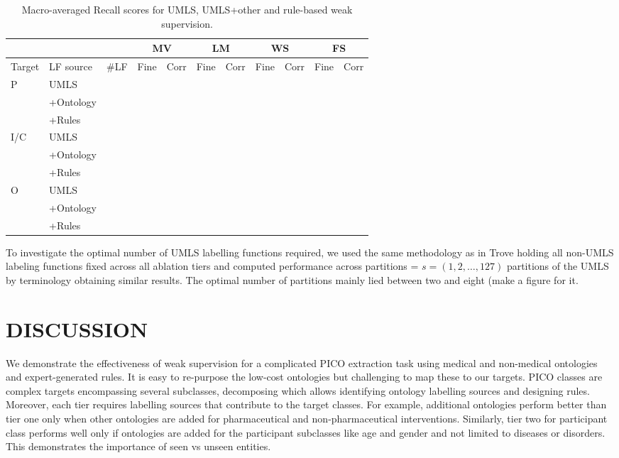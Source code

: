 \documentclass[10.7pt,]{article}
\begin{document}
\begin{table}[!ht]
    \centering
    \begin{tabular}{|l|l|l|l|l|l|l|l|l|l|l|}
        \hline
        \multicolumn{3}{|c|}{} &
        \multicolumn{2}{|c|}{MV} & \multicolumn{2}{|c|}{LM} & \multicolumn{2}{|c|}{WS} & \multicolumn{2}{|c|}{FS} \\
        \hline
        Target & LF source & \#LF & Fine & Corr & Fine & Corr & Fine & Corr & Fine & Corr \\ \hline
        P & UMLS & ~ & ~ & ~ & ~ & ~ & ~ & ~ & ~ & ~  \\ \hline
        ~ & +Ontology & ~ & ~ & ~ & ~ & ~ & ~ & ~ & ~ & ~  \\ \hline
        ~ & +Rules & ~ & ~ & ~ & ~ & ~ & ~ & ~ & ~ & ~  \\ \hline
        I/C & UMLS & ~ & ~ & ~ & ~ & ~ & ~ & ~ & ~ & ~  \\ \hline
        ~ & +Ontology & ~ & ~ & ~ & ~ & ~ & ~ & ~ & ~ & ~   \\ \hline
        ~ & +Rules & ~ & ~ & ~ & ~ & ~ & ~ & ~ & ~ & ~   \\ \hline
        O & UMLS & ~ & ~ & ~ & ~ & ~ & ~ & ~ & ~ & ~   \\ \hline
        ~ & +Ontology & ~ & ~ & ~ & ~ & ~ & ~ & ~ & ~ & ~   \\ \hline
        ~ & +Rules & ~ & ~ & ~ & ~ & ~ & ~ & ~ & ~ & ~   \\\hline
    \end{tabular}
    \caption{\label{tab:recall_res} Macro-averaged Recall scores for UMLS, UMLS+other and rule-based weak supervision.}
\end{table}

To investigate the optimal number of UMLS labelling functions required, we used the same methodology as in Trove holding all non-UMLS labeling functions fixed across all ablation tiers and computed performance across partitions = $s = ( 1, 2, \dotso , 127 )$ partitions of the UMLS by terminology obtaining similar results.
The optimal number of partitions mainly lied between two and eight (make a figure for it.
%
%
%
\section{DISCUSSION}\label{discussion}
%
We demonstrate the effectiveness of weak supervision for a complicated PICO extraction task using medical and non-medical ontologies and expert-generated rules.
It is easy to re-purpose the low-cost ontologies but challenging to map these to our targets.
PICO classes are complex targets encompassing several subclasses, decomposing which allows identifying ontology labelling sources and designing rules. 
Moreover, each tier requires labelling sources that contribute to the target classes.
For example, additional ontologies perform better than tier one only when other ontologies are added for pharmaceutical and non-pharmaceutical interventions.
Similarly, tier two for participant class performs well only if ontologies are added for the participant subclasses like age and gender and not limited to diseases or disorders.
This demonstrates the importance of seen vs unseen entities. 
\end{document}
